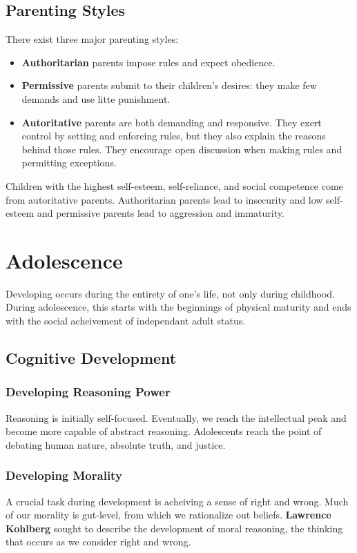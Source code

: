 \documentclass[12pt]{article}
\begin{document}
\subsection*{Parenting Styles}
There exist three major parenting styles:
\begin{itemize}
\item {\bf Authoritarian} parents impose rules and expect obedience.
\item {\bf Permissive} parents submit to their children's desires: they make few demands and use litte punishment.
\item {\bf Autoritative} parents are both demanding and responsive. They exert control by setting and enforcing rules, but they also explain the reasons behind those rules. They encourage open discussion when making rules and permitting exceptions.
\end{itemize}

Children with the highest self-esteem, self-reliance, and social competence come from autoritative parents. Authoritarian parents lead to insecurity and low self-esteem and permissive parents lead to aggression and immaturity.

\section*{Adolescence}
Developing occurs during the entirety of one's life, not only during childhood. During adolescence, this starts with the beginnings of physical maturity and ends with the social acheivement of independant adult status.

\subsection*{Cognitive Development}
\subsubsection*{Developing Reasoning Power}
Reasoning is initially self-focused. Eventually, we reach the intellectual peak and become more capable of abstract reasoning. Adolescents reach the point of debating human nature, absolute truth, and justice.

\subsubsection*{Developing Morality}
A crucial task during development is acheiving a sense of right and wrong. Much of our morality is gut-level, from which we rationalize out beliefs. {\bf Lawrence Kohlberg} sought to describe the development of moral reasoning, the thinking that occurs as we consider right and wrong.
\end{document}
